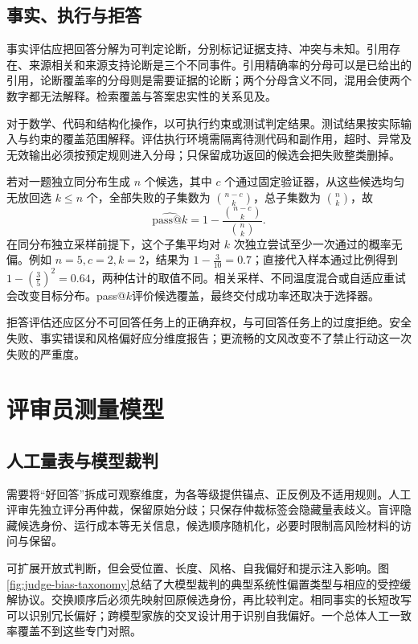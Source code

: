 \documentclass[../textbook.tex]{subfiles}
\begin{document}
\subsection{事实、执行与拒答}
事实评估应把回答分解为可判定论断，分别标记证据支持、冲突与未知。引用存在、来源相关和来源支持论断是三个不同事件。引用精确率的分母可以是已给出的引用，论断覆盖率的分母则是需要证据的论断；两个分母含义不同，混用会使两个数字都无法解释。检索覆盖与答案忠实性的关系见及。

对于数学、代码和结构化操作，以可执行约束或测试判定结果。测试结果按实际输入与约束的覆盖范围解释。评估执行环境需隔离待测代码和副作用，超时、异常及无效输出必须按预定规则进入分母；只保留成功返回的候选会把失败整类删掉。

若对一题独立同分布生成 $n$ 个候选，其中 $c$ 个通过固定验证器，从这些候选均匀无放回选 $k\leq n$ 个，全部失败的子集数为 $\binom{n-c}{k}$，总子集数为 $\binom nk$，故
\begin{equation}
 \widehat{\mathrm{pass@}k}=1-\frac{\binom{n-c}{k}}{\binom nk}.
 \label{eq:eval-passk}
\end{equation}
在同分布独立采样前提下，这个子集平均对 $k$ 次独立尝试至少一次通过的概率无偏\cite{chen2021codeeval}。例如 $n=5,c=2,k=2$，结果为 $1-\frac{3}{10}=0.7$；直接代入样本通过比例得到 $1-(\frac{3}{5})^2=0.64$，两种估计的取值不同。相关采样、不同温度混合或自适应重试会改变目标分布。pass@$k$评价候选覆盖，最终交付成功率还取决于选择器。

拒答评估还应区分不可回答任务上的正确弃权，与可回答任务上的过度拒绝。安全失败、事实错误和风格偏好应分维度报告；更流畅的文风改变不了禁止行动这一次失败的严重度。

\section{评审员测量模型}

\subsection{人工量表与模型裁判}
需要将“好回答”拆成可观察维度，为各等级提供锚点、正反例及不适用规则。人工评审先独立评分再仲裁，保留原始分歧；只保存仲裁标签会隐藏量表歧义。盲评隐藏候选身份、运行成本等无关信息，候选顺序随机化，必要时限制高风险材料的访问与保留。

可扩展开放式判断，但会受位置、长度、风格、自我偏好和提示注入影响\cite{zheng2023judge}。图\ref{fig:judge-bias-taxonomy}总结了大模型裁判的典型系统性偏置类型与相应的受控缓解协议。交换顺序后必须先映射回原候选身份，再比较判定。相同事实的长短改写可以识别冗长偏好；跨模型家族的交叉设计用于识别自我偏好。一个总体人工一致率覆盖不到这些专门对照。
\end{document}
